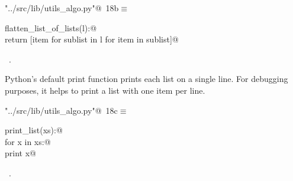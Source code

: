 \documentclass[11.5pt]{report}
\begin{document}
\begin{flushleft} \small
\begin{minipage}{\linewidth}\label{scrap15}\raggedright\small
{} \verb@"../src/lib/utils_algo.py"@\nobreak\ {\footnotesize {18b}}$\equiv$
\vspace{-1ex}
\begin{list}{}{} \item
\mbox{}\verb@def flatten_list_of_lists(l):@\\
\mbox{}\verb@       return [item for sublist in l for item in sublist]@\\
\mbox{}\verb@@{\NWsep}
\end{list}
\vspace{-1.5ex}
\footnotesize
\begin{list}{}{\setlength{\itemsep}{-\parsep}\setlength{\itemindent}{-\leftmargin}}
\item \NWtxtFileDefBy\ .

\item{}
\end{list}
\end{minipage}\vspace{4ex}
\end{flushleft}

\vspace{-0.8cm}
\newchunk Python's default print function prints each list on a single line. For 
debugging purposes,  it helps to print a list with one item per line. 

\begin{flushleft} \small\label{scrap16}\raggedright\small
{} \verb@"../src/lib/utils_algo.py"@\nobreak\ {\footnotesize {18c}}$\equiv$
\vspace{-1ex}
\begin{list}{}{} \item
\mbox{}\verb@def print_list(xs):@\\
\mbox{}\verb@    for x in xs:@\\
\mbox{}\verb@        print x@\\
\mbox{}\verb@@{\NWsep}
\end{list}
\vspace{-1.5ex}
\footnotesize
\begin{list}{}{\setlength{\itemsep}{-\parsep}\setlength{\itemindent}{-\leftmargin}}
\item \NWtxtFileDefBy\ .

\item{}
\end{list}
\vspace{4ex}
\end{flushleft}
\end{document}
